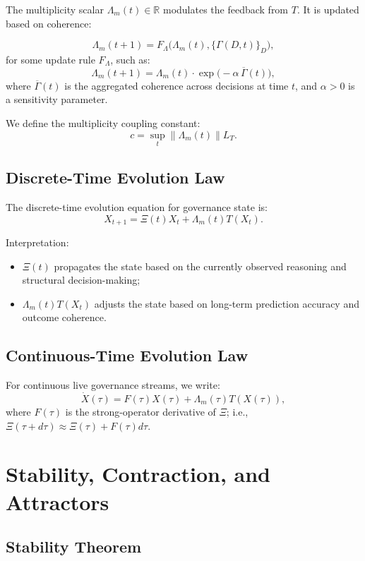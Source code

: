 \documentclass[11pt]{article}
\begin{document}
The multiplicity scalar \(\Lambda_m(t) \in \mathbb{R}\) modulates the feedback from \(T\). It is updated based on coherence:

\[
  \Lambda_m(t+1) = F_\Lambda\big(\Lambda_m(t), \{\Gamma(D,t)\}_{D}\big),
\]
for some update rule \(F_\Lambda\), such as:
\[
  \Lambda_m(t+1) = \Lambda_m(t) \cdot \exp\big(-\alpha \, \overline{\Gamma}(t)\big),
\]
where \(\overline{\Gamma}(t)\) is the aggregated coherence across decisions at time \(t\), and \(\alpha > 0\) is a sensitivity parameter.

We define the multiplicity coupling constant:
\[
  c = \sup_t \|\Lambda_m(t)\| L_T.
\]

\subsection{Discrete-Time Evolution Law}

The discrete-time evolution equation for governance state is:
\[
  X_{t+1} = \Xi(t) X_t + \Lambda_m(t) T(X_t).
\]

Interpretation:
\begin{itemize}[leftmargin=1.5em]
    \item \(\Xi(t)\) propagates the state based on the currently observed reasoning and structural decision-making;
    \item \(\Lambda_m(t) T(X_t)\) adjusts the state based on long-term prediction accuracy and outcome coherence.
\end{itemize}

\subsection{Continuous-Time Evolution Law}

For continuous live governance streams, we write:
\[
  \dot{X}(\tau) = F(\tau) X(\tau) + \Lambda_m(\tau) T(X(\tau)),
\]
where \(F(\tau)\) is the strong-operator derivative of \(\Xi\); i.e., \(\Xi(\tau + d\tau) \approx \Xi(\tau) + F(\tau) d\tau\).

\section{Stability, Contraction, and Attractors}

\subsection{Stability Theorem}
\end{document}
